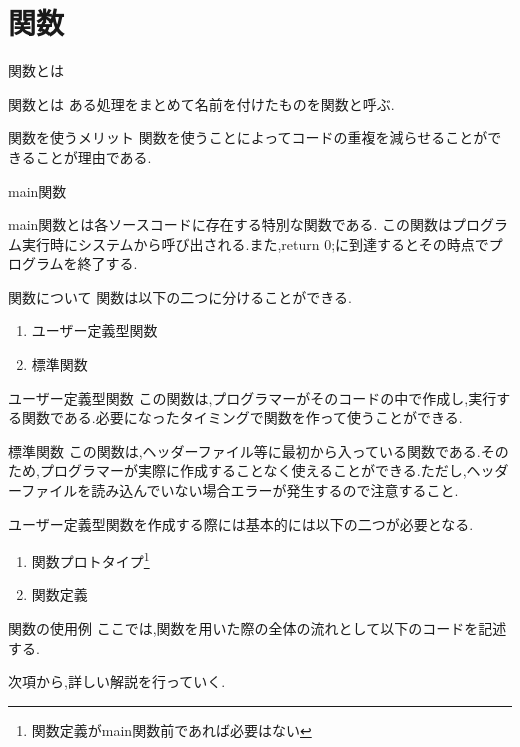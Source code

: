 \section{関数}
\begin{frame}{関数とは}
    \begin{block}{関数とは}
         ある処理をまとめて名前を付けたものを関数と呼ぶ.
    \end{block}
    \begin{block}{関数を使うメリット}
        関数を使うことによってコードの重複を減らせることができることが理由である.
    \end{block}
\end{frame}

\begin{frame}[fragile]{main関数}\label{main}
    
    main関数とは各ソースコードに存在する特別な関数である.
    この関数はプログラム実行時にシステムから呼び出される.また,return 0;に到達するとその時点でプログラムを終了する.
\end{frame}
\begin{frame}{関数について}
    関数は以下の二つに分けることができる.
    \begin{enumerate}
        \item ユーザー定義型関数
        \item 標準関数
    \end{enumerate}
    \begin{block}{ユーザー定義型関数}
        この関数は,プログラマーがそのコードの中で作成し,実行する関数である.必要になったタイミングで関数を作って使うことができる.
    \end{block}
    \begin{block}{標準関数}
       この関数は,ヘッダーファイル等に最初から入っている関数である.そのため,プログラマーが実際に作成することなく使えることができる.ただし,ヘッダーファイルを読み込んでいない場合エラーが発生するので注意すること. 
    \end{block}
    ユーザー定義型関数を作成する際には基本的には以下の二つが必要となる.
    \begin{enumerate}
        \item 関数プロトタイプ\footnote{関数定義がmain関数前であれば必要はない}
        \item 関数定義
    \end{enumerate}
\end{frame}

\begin{frame}[fragile]{関数の使用例}
    ここでは,関数を用いた際の全体の流れとして以下のコードを記述する.
    \begin{minipage}{\linewidth}
        
    \end{minipage}
    次項から,詳しい解説を行っていく.
\end{frame}

